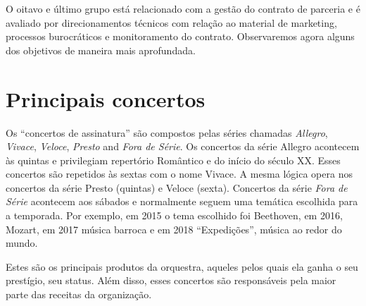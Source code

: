\documentclass[a4paper, 12pt, openright, oneside, german, french, english, brazil]{abntex2}
\begin{document}
	
	O oitavo e último grupo está relacionado com a gestão do contrato de parceria e é avaliado por direcionamentos técnicos com relação ao material de marketing, processos burocráticos e monitoramento do contrato. Observaremos agora alguns dos objetivos de maneira mais aprofundada.
	
	\section{Principais concertos}
	
	
	Os ``concertos de assinatura'' são compostos pelas séries chamadas \textit{Allegro}, \textit{Vivace}, \textit{Veloce}, \textit{Presto} and \textit{Fora de Série}. Os concertos da série Allegro acontecem às quintas e privilegiam repertório Romântico e do início do século XX. Esses concertos são repetidos às sextas com o nome Vivace. A mesma lógica opera nos concertos da série Presto (quintas) e Veloce (sexta). Concertos da série \textit{Fora de Série} acontecem aos sábados e normalmente seguem uma temática escolhida para a temporada. Por exemplo, em 2015 o tema escolhido foi Beethoven, em 2016, Mozart, em 2017 música barroca e em 2018 ``Expedições'', música ao redor do mundo.
	
	
	Estes são os principais produtos da orquestra, aqueles pelos quais ela ganha o seu prestígio, seu status. Além disso, esses concertos são responsáveis pela maior parte das receitas da organização.
	
\end{document}
